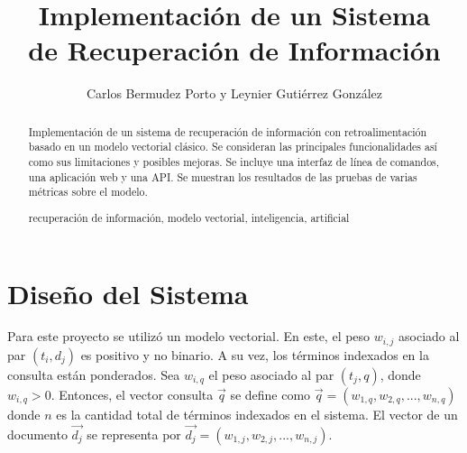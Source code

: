 \documentclass[runningheads,a4paper]{llncs}
\newcommand{\keywords}[1]{\par\addvspace\baselineskip
\noindent\keywordname\enspace\ignorespaces#1}
\begin{document}
\mainmatter

\title{Implementación de un Sistema\\de Recuperación de Información}


\author{Carlos Bermudez Porto y Leynier Gutiérrez González}



\maketitle


\begin{abstract}
  Implementación de un sistema de recuperación de información con retroalimentación basado en un modelo vectorial clásico. Se consideran las principales funcionalidades así como sus limitaciones y posibles mejoras. Se incluye una interfaz de línea de comandos, una aplicación web y una API. Se muestran los resultados de las pruebas de varias métricas sobre el modelo.
  \keywords{recuperación de información, modelo vectorial, inteligencia, artificial}
\end{abstract}

\section{Diseño del Sistema}

Para este proyecto se utilizó un modelo vectorial. En este, el peso $w_{i,j}$ asociado al par $(t_i,d_j)$ es positivo y no binario. A su vez, los términos indexados en la consulta están ponderados. Sea $w_{i,q}$ el peso asociado al par $(t_j,q)$, donde $w_{i,q} > 0$. Entonces, el vector consulta $\vec{q}$ se define como $\vec{q} = (w_{1,q}, w_{2,q}, ..., w_{n,q})$ donde $n$ es la cantidad total de términos indexados en el sistema. El vector de un documento $\vec{d_j}$ se representa por $\vec{d_j} = (w_{1,j}, w_{2,j}, ..., w_{n,j})$.
\end{document}

